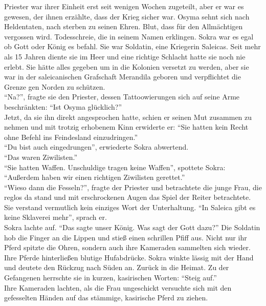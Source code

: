 Priester war ihrer Einheit erst seit wenigen Wochen zugeteilt, aber er war es gewesen, der ihnen 
erzählte, dass der Krieg sicher war. Osyma sehnt sich nach Heldentaten, nach sterben zu seinen 
Ehren. Blut, dass für den Allmächtigen vergossen wird. Todesschreie, die in seinem Namen erklingen. 
Sokra war es egal ob Gott oder König es befahl. Sie war Soldatin, eine Kriegerin Saleicas. Seit 
mehr als 15 Jahren diente sie im Heer und eine richtige Schlacht hatte sie noch nie erlebt. Sie 
hätte alles gegeben um in die Kolonien versetzt zu werden, aber sie war in der saleicanischen 
Grafschaft Merandila geboren und verpflichtet die Grenze gen Norden zu schützen.\\
``Na?'', fragte sie den Priester, dessen Tattoowierungen sich auf seine Arme beschränkten: ``Ist 
Osyma glücklich?''\\
Jetzt, da sie ihn direkt angesprochen hatte, schien er seinen Mut zusammen zu nehmen und mit 
trotzig erhobenem Kinn erwiderte er: ``Sie hatten kein Recht ohne Befehl ins Feindesland 
einzudringen.''\\
``Du bist auch eingedrungen'', erwiederte Sokra abwertend.\\
``Das waren Ziwilisten.''\\
``Sie hatten Waffen. Unschuldige tragen keine Waffen'', spottete Sokra: ``Außerdem haben wir einen 
richtigen Ziwilisten gerettet.''\\
``Wieso dann die Fesseln?'', fragte der Priester und betrachtete die junge Frau, die reglos da 
stand und mit erschrockenen Augen das Spiel der Reiter betrachtete. Sie verstand vermutlich kein 
einziges Wort der Unterhaltung. ``In Saleica gibt es keine Sklaverei mehr'', sprach er.\\
Sokra lachte auf. ``Das sagte unser König. Was sagt der Gott dazu?''
Die Soldatin hob die Finger an die Lippen und stieß einen schrillen Pfiff aus. Nicht nur ihr Pferd 
spitzte die Ohren, sondern auch ihre Kameraden sammelten sich wieder. Ihre Pferde hinterließen 
blutige Hufabdrücke. Sokra winkte lässig mit der Hand und deutete den Rückzug nach Süden an. Zurück 
in die Heimat. Zu der Gefangenen herrschte sie in kurzen, kasirischen Worten: ``Steig auf.''\\
Ihre Kameraden lachten, als die Frau ungeschickt versuchte sich mit den gefesselten Händen auf das 
stämmige, kasirische Pferd zu ziehen. 

